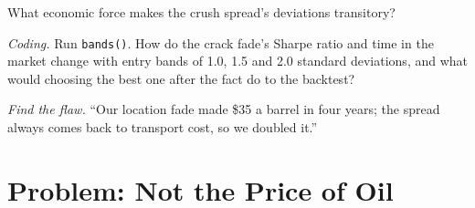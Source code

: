 \begin{exercise}[$\star\star$]\label{exo:s2:commodity-spreads:6}
What economic force makes the crush spread's deviations transitory?
\end{exercise}

\begin{exercise}[$\star\star\star$]\label{exo:s2:commodity-spreads:7}
\emph{Coding.} Run \texttt{bands()}. How do the crack fade's Sharpe ratio and time in the market change with entry bands of 1.0, 1.5 and 2.0
standard deviations, and what would choosing the best one after the fact do to the backtest?
\end{exercise}

\begin{exercise}[$\star\star\star$]\label{exo:s2:commodity-spreads:8}
\emph{Find the flaw.} ``Our location fade made \$35 a barrel in four years; the spread always comes back to transport cost, so we doubled it.''
\end{exercise}

\section{Problem: Not the Price of Oil}

